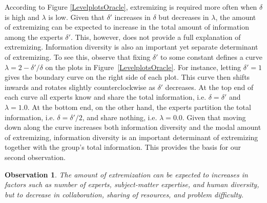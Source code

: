 \documentclass[11pt]{article}
\newtheorem{observation}[theorem]{Observation}
\theoremstyle{definition}
\theoremstyle{definition}
\begin{document}
According to Figure \ref{LevelplotsOracle}, extremizing is required 
more often when $\delta$ is high and $\lambda$ is low.  Given that 
$\delta'$ increases in $\delta$ but decreases in $\lambda$, the amount 
of extremizing can be expected to increase in the total amount of 
information among the experts $\delta'$.  This, however, does not 
provide a full explanation of extremizing.  Information diversity 
is also an important yet separate determinant of extremizing.  
To see this, observe that fixing $\delta'$ to some constant 
defines a curve $\lambda = 2 - \delta'/\delta$ on the plots in 
Figure~\ref{LevelplotsOracle}.  For instance, letting $\delta' = 1$ 
gives the boundary curve on the right side of each plot.  This curve 
then shifts inwards and rotates slightly counterclockwise as 
$\delta'$ decreases.  At the top end of each curve all experts 
know and share the total information, i.e. $\delta = \delta'$ and 
$\lambda = 1.0$.  At the bottom end, on the other hand, the experts 
partition the total information, i.e. $\delta = \delta'/2$, and 
share nothing, i.e. $\lambda = 0.0$.  Given that moving down along 
the curve increases both information diversity and the modal amount 
of extremizing, information diversity is an important determinant 
of extremizing together with the group's total information.  This provides the basis for our second observation.

\begin{observation}
The amount of extremization can be expected to increases in factors such as number of experts, subject-matter expertise, and human diversity, but to decrease in collaboration, sharing of resources, and problem difficulty.
\end{observation}

\end{document}
